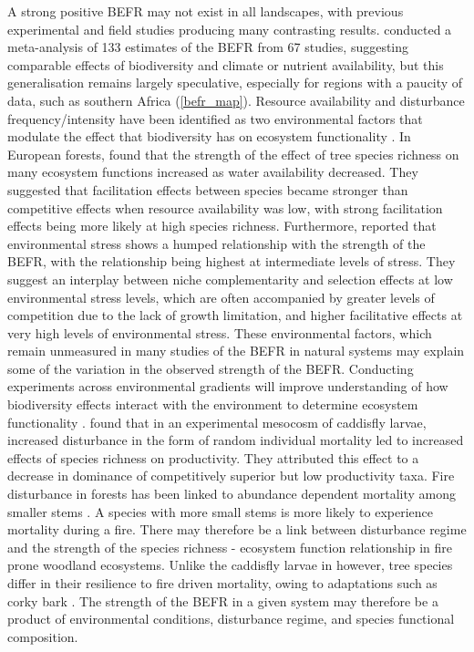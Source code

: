 \begin{refsection}
A strong positive BEFR may not exist in all landscapes, with previous experimental and field studies producing many contrasting results. \citet{Duffy2017} conducted a meta-analysis of 133 estimates of the BEFR from 67 studies, suggesting comparable effects of biodiversity and climate or nutrient availability, but this generalisation remains largely speculative, especially for regions with a paucity of data, such as southern Africa (\autoref{befr_map}). Resource availability and disturbance frequency/intensity have been identified as two environmental factors that modulate the effect that biodiversity has on ecosystem functionality \citep{Tilman2012a, Tilman2014, Hooper2012}. In European forests, \citet{Ratcliffe2017} found that the strength of the effect of tree species richness on many ecosystem functions increased as water availability decreased. They suggested that facilitation effects between species became stronger than competitive effects when resource availability was low, with strong facilitation effects being more likely at high species richness. Furthermore, \citet{Baert2018} reported that environmental stress shows a humped relationship with the strength of the BEFR, with the relationship being highest at intermediate levels of stress. They suggest an interplay between niche complementarity and selection effects at low environmental stress levels, which are often accompanied by greater levels of competition due to the lack of growth limitation, and higher facilitative effects at very high levels of environmental stress. These environmental factors, which remain unmeasured in many studies of the BEFR in natural systems may explain some of the variation in the observed strength of the BEFR. Conducting experiments across environmental gradients will improve understanding of how biodiversity effects interact with the environment to determine ecosystem functionality \citep{Turnbull2016, Tilman2014}. \citet{Cardinale2002} found that in an experimental mesocosm of caddisfly larvae, increased disturbance in the form of random individual mortality led to increased effects of species richness on productivity. They attributed this effect to a decrease in dominance of competitively superior but low productivity taxa. Fire disturbance in forests has been linked to abundance dependent mortality among smaller stems \citep{Roques2001}. A species with more small stems is more likely to experience mortality during a fire. There may therefore be a link between disturbance regime and the strength of the species richness - ecosystem function relationship in fire prone woodland ecosystems. Unlike the caddisfly larvae in \citet{Cardinale2002} however, tree species differ in their resilience to fire driven mortality, owing to adaptations such as corky bark \citep{Solbrig1996}. The strength of the BEFR in a given system may therefore be a product of environmental conditions, disturbance regime, and species functional composition.


\end{refsection}
